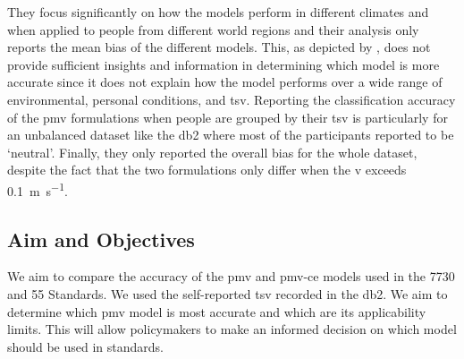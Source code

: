 They focus significantly on how the models perform in different climates and when applied to people from different world regions and their analysis only reports the mean bias of the different models.
This, as depicted by , does not provide sufficient insights and information in determining which model is more accurate since it does not explain how the model performs over a wide range of environmental, personal conditions, and \ac{tsv}.
Reporting the classification accuracy of the \ac{pmv} formulations when people are grouped by their \ac{tsv} is particularly for an unbalanced dataset like the \ac{db2} where most of the participants reported to be `neutral'.
Finally, they only reported the overall bias for the whole dataset, despite the fact that the two formulations only differ when the \ac{v} exceeds \qty{0.1}{\m\per\s}.

\subsection{Aim and Objectives}\label{subsec:aim-and-objectives}
We aim to compare the accuracy of the \ac{pmv} and \ac{pmv-ce} models used in the \gls{7730} and \gls{55} Standards.
We used the self-reported \ac{tsv} recorded in the \ac{db2}.
We aim to determine which \ac{pmv} model is most accurate and which are its applicability limits.
This will allow policymakers to make an informed decision on which model should be used in standards.